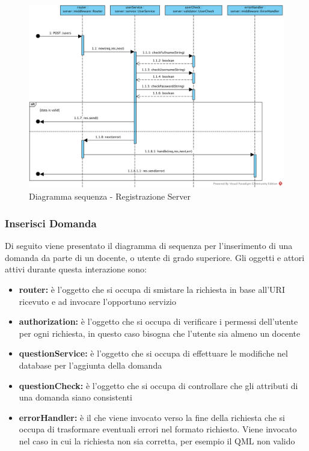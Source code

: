 \documentclass[12pt,a4paper]{article}
\begin{document}
\begin{center}
	\begin{figure}[H]
		\centering \includegraphics[max width=\myheight, angle=90]{../img/diagrammiSequenza/registrazioneServer.png}
		\caption{Diagramma sequenza - Registrazione Server}
	\end{figure}
\end{center}

\newpage
\subsubsection{Inserisci Domanda}
Di seguito viene presentato il diagramma di sequenza per l'inserimento di una domanda da parte di un docente, o utente di grado superiore. Gli oggetti e attori attivi durante questa interazione sono:

\begin{itemize}
	\item \textbf{router:} è l'oggetto che si occupa di smistare la richiesta in base all’URI ricevuto e ad invocare l’opportuno servizio
	\item \textbf{authorization:} è l'oggetto che si occupa di verificare i permessi dell'utente per ogni richiesta, in questo caso bisogna che l'utente sia almeno un docente
	\item \textbf{questionService:} è l'oggetto che si occupa di effettuare le modifiche nel database per l'aggiunta della domanda
	\item \textbf{questionCheck:} è l'oggetto che si occupa di controllare che gli attributi di una domanda siano consistenti
	\item \textbf{errorHandler:} è il  che viene invocato verso la fine della richiesta che si occupa di trasformare eventuali errori nel formato  richiesto. Viene invocato nel caso in cui la richiesta non sia corretta, per esempio il QML non valido
\end{itemize}
\end{document}
